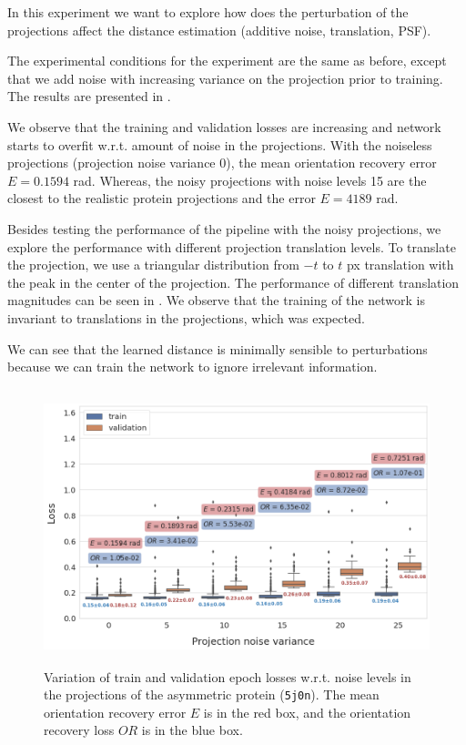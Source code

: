 In this experiment we want to explore how does the perturbation of the projections affect the distance estimation (additive noise, translation, PSF). 

The experimental conditions for the experiment are the same as before, except that we add noise with increasing variance on the projection prior to training. 
The results are presented in . 

We observe that the training and validation losses are increasing and network starts to overfit w.r.t. amount of noise in the projections. 
With the noiseless projections (projection noise variance 0), the mean orientation recovery error $E = 0.1594$ rad. 
Whereas, the noisy projections with noise levels 15 are the closest to the realistic protein projections and the error $E=4189$ rad. 

Besides testing the performance of the pipeline with the noisy projections, we explore the performance with different projection translation levels. 
To translate the projection, we use a triangular distribution from $-t$ to $t$ px translation with the peak in the center of the projection. 
The performance of different translation magnitudes can be seen in . 
We observe that the training of the network is invariant to translations in the projections, which was expected.

We can see that the learned distance is minimally sensible to perturbations because we can train the network to ignore irrelevant information.

\begin{figure}[ht!]
    \centering
        \includegraphics[height=8cm]{images/de_noises_nums.png}
        \caption{%
            Variation of train and validation epoch losses w.r.t. noise levels in the projections of the asymmetric protein (\texttt{5j0n}). The mean orientation recovery error $E$ is in the red box, and the orientation recovery loss $OR$ is in the blue box.
        }\label{fig:distance-estimation-vary-projection-noise}
\end{figure}

